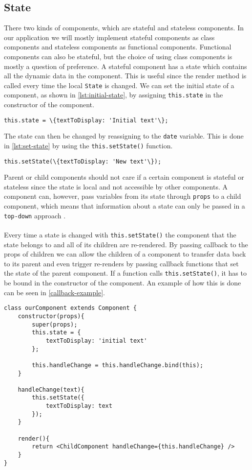 \subsection*{State}
There two kinds of components, which are stateful and stateless components.
In our application we will mostly implement stateful components as class components and stateless components as functional components. 
Functional components can also be stateful, but the choice of using class components is mostly a question of preference.
A stateful component has a state which contains all the dynamic data in the component.
This is useful since the render method is called every time the local \texttt{State} is changed.
We can set the initial state of a component, as shown in \autoref{lst:initial-state}, by assigning \texttt{this.state} in the constructor of the component.
\begin{lstlisting}[caption={Setting the initial state}, label={lst:initial-state}, captionpos=b]
    this.state = \{textToDisplay: 'Initial text'\};
\end{lstlisting}
The state can then be changed by reassigning to the \texttt{date} variable.
This is done in \autoref{lst:set-state} by using the \texttt{this.setState()} function.
\begin{lstlisting}[caption={Using setState in React}, label={lst:set-state}, captionpos=b]
    this.setState(\{textToDisplay: 'New text'\});
\end{lstlisting}
Parent or child components should not care if a certain component is stateful or stateless since the state is local and not accessible by other components.
A component can, however, pass variables from its state through \texttt{props} to a child component, which means that information about a state can only be passed in a \texttt{top-down} approach \cite{ReactJS}.
\\\\
Every time a state is changed with \texttt{this.setState()} the component that the state belongs to and all of its children are re-rendered.
By passing callback to the props of children we can allow  the children of a component to transfer data back to its parent and even trigger re-renders by passing callback functions that set the state of the parent component.
If a function calls \texttt{this.setState()}, it has to be bound in the constructor of the component.
An example of how this is done can be seen in \autoref{callback-example}.
\begin{lstlisting}[caption={An example of a callback function}, label={callback-example}, captionpos=b]
class ourComponent extends Component {
	constructor(props){
		super(props);
		this.state = {
			textToDisplay: 'initial text'
		};

		this.handleChange = this.handleChange.bind(this);
	}

	handleChange(text){
		this.setState({
			textToDisplay: text
		});
	}

	render(){
		return <ChildComponent handleChange={this.handleChange} />
	}
}
\end{lstlisting}

